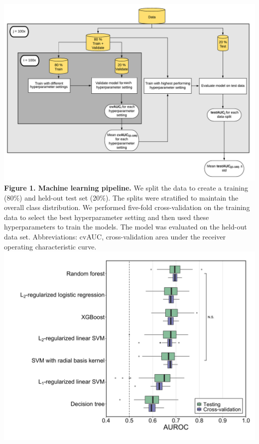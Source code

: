 \documentclass[11pt,]{article}
\begin{document}
\includegraphics{Figure_1.pdf} \textbf{Figure 1. Machine learning
pipeline.} We split the data to create a training (80\%) and held-out
test set (20\%). The splits were stratified to maintain the overall
class distribution. We performed five-fold cross-validation on the
training data to select the best hyperparameter setting and then used
these hyperparameters to train the models. The model was evaluated on
the held-out data set. Abbreviations: cvAUC, cross-validation area under
the receiver operating characteristic curve. \newpage
\includegraphics{Figure_2.png}
\end{document}
